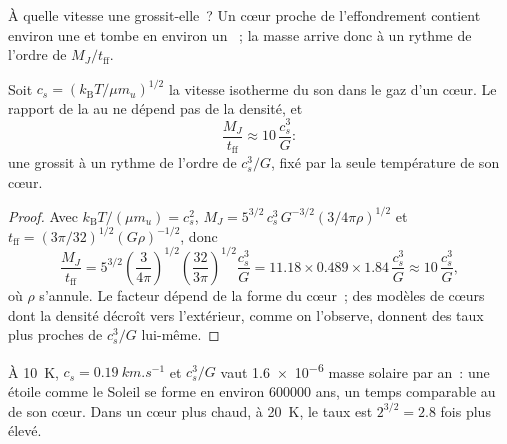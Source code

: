 À quelle vitesse une  grossit-elle~? Un cœur proche de l'effondrement contient environ une
 et tombe en environ un ~; la masse arrive donc à un rythme de l'ordre de
$M_J/t_{\mathrm{ff}}$.

\begin{proposition}
\label{prop:b2:ism-star-formation:accretion}
Soit $c_s = (k_{\mathrm B}T/\mu m_u)^{1/2}$ la vitesse isotherme du son dans
le gaz d'un cœur. Le rapport de la  au  ne dépend pas de la densité,
et
\[
  \frac{M_J}{t_{\mathrm{ff}}} \approx 10\,\frac{c_s^3}{G}:
\]
une  grossit à un rythme de l'ordre de $c_s^3/G$, fixé par la seule température
de son cœur.
\end{proposition}

\begin{proof}
Avec $k_{\mathrm B}T/(\mu m_u) = c_s^2$, $M_J = 5^{3/2}\,c_s^3\,G^{-3/2}
(3/4\pi\rho)^{1/2}$ et $t_{\mathrm{ff}} = (3\pi/32)^{1/2}(G\rho)^{-1/2}$, donc
\[
  \frac{M_J}{t_{\mathrm{ff}}} = 5^{3/2}\left(\frac{3}{4\pi}\right)^{1/2}
  \left(\frac{32}{3\pi}\right)^{1/2}\frac{c_s^3}{G}
  = 11.18\times0.489\times1.84\,\frac{c_s^3}{G} \approx 10\,\frac{c_s^3}{G},
\]
où $\rho$ s'annule. Le facteur dépend de la forme du cœur~; des modèles de cœurs dont
la densité décroît vers l'extérieur, comme on l'observe, donnent des taux plus proches de $c_s^3/G$
lui-même.
\end{proof}

À \qty{10}{K}, $c_s = \qty{0.19}{km.s^{-1}}$ et $c_s^3/G$ vaut
\num{1.6e-6} masse solaire par an~: une étoile comme le Soleil se forme en environ \num{600000} ans, un temps comparable au  de
son cœur. Dans un cœur plus chaud, à \qty{20}{K}, le taux est $2^{3/2} = 2.8$ fois plus
élevé.

